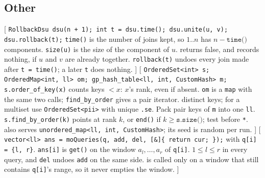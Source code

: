 \subsection{Other}
[
	 \texttt{RollbackDsu dsu(n + 1); int t = dsu.time(); dsu.unite(u, v); dsu.rollback(t);}
	 \texttt{time()} is the number of joins kept, so $1..n$ has $n - \texttt{time()}$ components. \texttt{size(u)} is the size of the component of $u$.
	 returns false, and records nothing, if $u$ and $v$ are already together.
	 \texttt{rollback(t)} undoes every join made after \texttt{t = time()}; a later \texttt{t} does nothing.
]\label{rollbackdsu}
[
	 \texttt{OrderedSet<int> s; OrderedMap<int, ll> om; gp\_hash\_table<ll, int, CustomHash> m;}
	 \texttt{s.order\_of\_key(x)} counts keys $< x$: $x$'s rank, even if absent. \texttt{om} is a \texttt{map} with the same two calls; \texttt{find\_by\_order} gives a pair iterator.
	 distinct keys; for a multiset use \texttt{OrderedSet<pii>} with unique \texttt{.se}. Pack pair keys of \texttt{m} into one \texttt{ll}.
	 \texttt{s.find\_by\_order(k)} points at rank $k$, or \texttt{end()} if $k \ge \texttt{s.size()}$; test before \texttt{*}.
	 also serves \texttt{unordered\_map<ll, int, CustomHash>}; its seed is random per run.
]\label{pbds}
[
	 \texttt{vector<ll> ans = moQueries(q, add, del, [\&]\{ return cur; \});} with \texttt{q[i] = \{l, r\}}.
	 \texttt{ans[i]} is \texttt{get()} on the window $a_l, \dots, a_r$ of \texttt{q[i]}.
	 $1 \le l \le r$ in every query, and \texttt{del} undoes \texttt{add} on the same side.
	 is called only on a window that still contains \texttt{q[i]}'s range, so it never empties the window.
]\label{mo}
